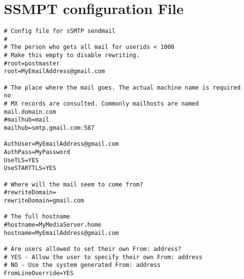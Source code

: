 \chapter{SSMPT configuration File}
\label{app:emailconfig}

\begin{lstlisting}
# Config file for sSMTP sendmail
#
# The person who gets all mail for userids < 1000
# Make this empty to disable rewriting.
#root=postmaster
root=MyEmailAddress@gmail.com

# The place where the mail goes. The actual machine name is required no
# MX records are consulted. Commonly mailhosts are named mail.domain.com
#mailhub=mail
mailhub=smtp.gmail.com:587

AuthUser=MyEmailAddress@gmail.com
AuthPass=MyPassword
UseTLS=YES
UseSTARTTLS=YES

# Where will the mail seem to come from?
#rewriteDomain=
rewriteDomain=gmail.com

# The full hostname
#hostname=MyMediaServer.home
hostname=MyEmailAddress@gmail.com

# Are users allowed to set their own From: address?
# YES - Allow the user to specify their own From: address
# NO - Use the system generated From: address
FromLineOverride=YES
\end{lstlisting}